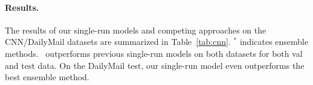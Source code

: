 \paragraph{Results.}


The results of our single-run models and competing approaches on the CNN/DailyMail datasets are summarized in Table~\ref{tab:cnn}. 
$^*$ indicates ensemble methods. 
\sysshort\ outperforms previous single-run models on both datasets for both val and test data. On the DailyMail test, our single-run model even outperforms the best ensemble method.


